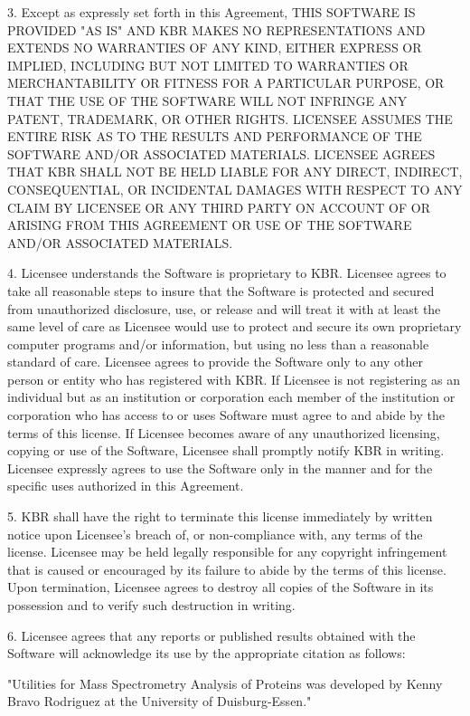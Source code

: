 3. Except as expressly set forth in this Agreement, THIS SOFTWARE IS PROVIDED "AS IS" AND KBR MAKES NO REPRESENTATIONS AND EXTENDS NO WARRANTIES OF ANY KIND, EITHER EXPRESS OR IMPLIED, INCLUDING BUT NOT LIMITED TO WARRANTIES OR MERCHANTABILITY OR FITNESS FOR A PARTICULAR PURPOSE, OR THAT THE USE OF THE SOFTWARE WILL NOT INFRINGE ANY PATENT, TRADEMARK, OR OTHER RIGHTS. LICENSEE ASSUMES THE ENTIRE RISK AS TO THE RESULTS AND PERFORMANCE OF THE SOFTWARE AND/OR ASSOCIATED MATERIALS. LICENSEE AGREES THAT KBR SHALL NOT BE HELD LIABLE FOR ANY DIRECT, INDIRECT, CONSEQUENTIAL, OR INCIDENTAL DAMAGES WITH RESPECT TO ANY CLAIM BY LICENSEE OR ANY THIRD PARTY ON ACCOUNT OF OR ARISING FROM THIS AGREEMENT OR USE OF THE SOFTWARE AND/OR ASSOCIATED MATERIALS.

4. Licensee understands the Software is proprietary to KBR. Licensee agrees to take all reasonable steps to insure that the Software is protected and secured from unauthorized disclosure, use, or release and will treat it with at least the same level of care as Licensee would use to protect and secure its own proprietary computer programs and/or information, but using no less than a reasonable standard of care.  Licensee agrees to provide the Software only to any other person or entity who has registered with KBR. If Licensee is not registering as an individual but as an institution or corporation each member of the institution or corporation who has access to or uses Software must agree to and abide by the terms of this license. If Licensee becomes aware of any unauthorized licensing, copying or use of the Software, Licensee shall promptly notify KBR in writing. Licensee expressly agrees to use the Software only in the manner and for the specific uses authorized in this Agreement.

5. KBR shall have the right to terminate this license immediately by written notice upon Licensee's breach of, or non-compliance with, any terms of the license. Licensee may be held legally responsible for any copyright infringement that is caused or encouraged by its failure to abide by the terms of this license. Upon termination, Licensee agrees to destroy all copies of the Software in its possession and to verify such destruction in writing.

6. Licensee agrees that any reports or published results obtained with the Software will acknowledge its use by the appropriate citation as follows:

"Utilities for Mass Spectrometry Analysis of Proteins was developed by Kenny Bravo Rodriguez at the University of Duisburg-Essen."

